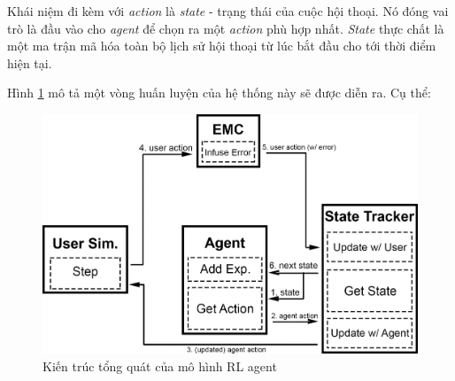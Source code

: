 Khái niệm đi kèm với \textit{action} là \textit{state} - trạng thái của cuộc hội thoại. Nó đóng vai trò là đầu vào cho \textit{agent} để chọn ra một \textit{action} phù hợp nhất. \textit{State} thực chất là một ma trận mã hóa toàn bộ lịch sử hội thoại từ lúc bắt đầu cho tới thời điểm hiện tại.

Hình \ref{fig:trainrefer} mô tả một vòng huấn luyện của hệ thống này sẽ được diễn ra. Cụ thể:

\begin{center}
    \begin{figure}[ht!]
        \begin{center}
         \includegraphics[scale=0.23]{chapter2/img/train_refer.png}
        \end{center}
        \caption{Kiến trúc tổng quát của mô hình RL agent}
        \label{fig:trainrefer}
    \end{figure}
\end{center}


